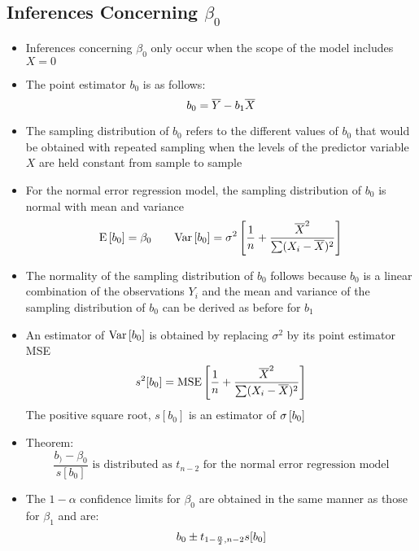 \subsection{Inferences Concerning $\beta_0$}
\begin{itemize}
\item Inferences concerning $\beta_0$ only occur when the scope of the model includes $X=0$
\item The point estimator $b_0$ is as follows: $$ b_0 = \overline{Y} - b_1\overline{X} $$ 
\item The sampling distribution of $b_0$ refers to the different values of $b_0$ that would be obtained with repeated sampling when the levels of the predictor variable $X$ are held constant from sample to sample 
\item For the normal error regression model, the sampling distribution of $b_0$ is normal with mean and variance $$ \mathrm{E}\left[ b_0 \right] = \beta_0 ~~~~~~ \mathrm{Var}\left[ b_0 \right] = \sigma^2\left[ \frac{1}{n} + \frac{\overline{X}^2}{\sum (X_i - \overline{X})^2} \right] $$ 
\item The normality of the sampling distribution of $b_0$ follows because $b_0$ is a linear combination of the observations $Y_i$ and the mean and variance of the sampling distribution of $b_0$ can be derived as before for $b_1$
\item An estimator of $\mathrm{Var}\left[ b_0 \right]$ is obtained by replacing $\sigma^2$ by its point estimator MSE $$ s^2[b_0] = \text{MSE}\left[ \frac{1}{n} + \frac{\overline{X}^2}{\sum (X_i - \overline{X})^2} \right] $$ The positive square root, $s[b_0]$ is an estimator of $\sigma \left[ b_0 \right]$
\item Theorem: $$ \frac{b_) - \beta_0}{s[b_0]} \text{ is distributed as } t_{n-2} \text{ for the normal error regression model} $$ 
\item The $1-\alpha$ confidence limits for $\beta_0$ are obtained in the same manner as those for $\beta_1$ and are: 
$$ b_0 \pm t_{1 - \frac{\alpha}{2}, n-2} s[b_0] $$ 
\end{itemize}

